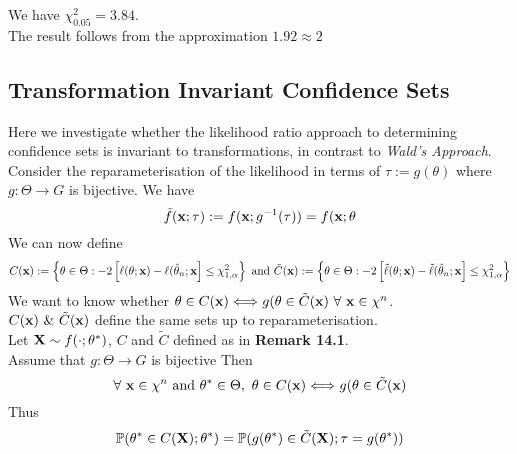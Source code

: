 \documentclass[11pt,a4paper]{article}
\begin{document}
We have $\chi^2_{0.05}=3.84$.\\
The result follows from the approximation $1.92\approx2$\proved

\subsection{Transformation Invariant Confidence Sets}

Here we investigate whether the likelihood ratio approach to determining confidence sets is invariant to transformations, in contrast to \textit{Wald's Approach}.\\
Consider the reparameterisation of the likelihood in terms of $\tau:=g(\theta)$ where $g:\Theta\to G$ is bijective. We have
$$\tilde{f}(\textbf{x};\tau):=f(\textbf{x};g^{-1}(\tau))=f(\textbf{x};\theta$$
We can now define
$$C(\textbf{x}):=\left\{\theta\in\Theta:-2\left[\ell(\theta;\textbf{x})-\ell(\hat\theta_n;\textbf{x}\right]\leq\chi^2_{1,\alpha}\right\}\text{ and }\tilde{C}(\textbf{x}):=\left\{\theta\in\Theta:-2\left[\tilde\ell(\theta;\textbf{x})-\tilde\ell(\hat\theta_n;\textbf{x}\right]\leq\chi^2_{1,\alpha}\right\}$$
We want to know whether $\theta\in C(\x)\Longleftrightarrow	g(\theta\in\tilde{C}(\x)\ \forall\ \x\in\chi^n$.\\
\ie $C(\textbf{x})\ \&\ \tilde{C}(\textbf{x})$ define the same sets up to reparameterisation.\\

\theorem{}
Let $\textbf{X}\sim f(\cdot;\theta^*)$, $C$ and $\tilde{C}$ defined as in \textbf{Remark 14.1}.\\
Assume that $g:\Theta\to G$ is bijective Then
$$\forall\ \x\in\chi^n\text{ and }\theta^*\in\Theta,\ \theta\in C(\x)\Longleftrightarrow g(\theta\in\tilde{C}(\x)$$
Thus
$$\mathbb{P}(\theta^*\in C(\textbf{X});\theta^*)=\mathbb{P}(g(\theta^*)\in\tilde{C}(\textbf{X});\tau=g(\theta^*))$$
\end{document}
